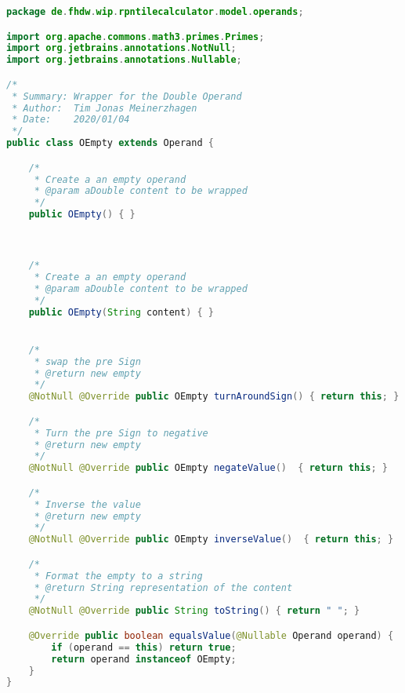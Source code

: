 \begin{lstlisting}[caption=OEmpty (Meinerzhagen),label=list:OEmpty,language=Java]
package de.fhdw.wip.rpntilecalculator.model.operands;

import org.apache.commons.math3.primes.Primes;
import org.jetbrains.annotations.NotNull;
import org.jetbrains.annotations.Nullable;

/*
 * Summary: Wrapper for the Double Operand
 * Author:  Tim Jonas Meinerzhagen
 * Date:    2020/01/04
 */
public class OEmpty extends Operand {

    /*
     * Create a an empty operand
     * @param aDouble content to be wrapped
     */
    public OEmpty() { }



    /*
     * Create a an empty operand
     * @param aDouble content to be wrapped
     */
    public OEmpty(String content) { }


    /*
     * swap the pre Sign
     * @return new empty
     */
    @NotNull @Override public OEmpty turnAroundSign() { return this; }

    /*
     * Turn the pre Sign to negative
     * @return new empty
     */
    @NotNull @Override public OEmpty negateValue()  { return this; }

    /*
     * Inverse the value
     * @return new empty
     */
    @NotNull @Override public OEmpty inverseValue()  { return this; }

    /*
     * Format the empty to a string
     * @return String representation of the content
     */
    @NotNull @Override public String toString() { return " "; }

    @Override public boolean equalsValue(@Nullable Operand operand) {
        if (operand == this) return true;
        return operand instanceof OEmpty;
    }
}
\end{lstlisting}    

